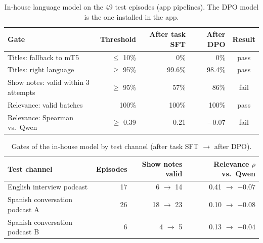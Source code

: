 \begin{table}[H]
\centering
\caption{In-house language model on the 49 test episodes (app pipelines). The DPO model is the one installed in the app.}
\label{tab:ownllm-gates}
\small
\begin{tabular}{@{}lrrrc@{}}
\toprule
\textbf{Gate} & \textbf{Threshold} & \textbf{After task SFT} & \textbf{After DPO} & \textbf{Result} \\
\midrule
Titles: fallback to mT5 & $\leq$ 10\% & 0\% & 0\% & pass \\
Titles: right language & $\geq$ 95\% & 99.6\% & 98.4\% & pass \\
Show notes: valid within 3 attempts & $\geq$ 95\% & 57\% & 86\% & fail \\
Relevance: valid batches & 100\% & 100\% & 100\% & pass \\
Relevance: Spearman vs.\ Qwen & $\geq$ 0.39 & 0.21 & $-0.07$ & fail \\
\bottomrule
\end{tabular}
\end{table}

\begin{table}[H]
\centering
\caption{Gates of the in-house model by test channel (after task SFT $\rightarrow$ after DPO).}
\label{tab:ownllm-channels}
\small
\begin{tabular}{@{}lrrr@{}}
\toprule
\textbf{Test channel} & \textbf{Episodes} & \textbf{Show notes valid} & \textbf{Relevance $\rho$ vs.\ Qwen} \\
\midrule
English interview podcast & 17 & 6 $\rightarrow$ 14 & 0.41 $\rightarrow$ $-0.07$ \\
Spanish conversation podcast A & 26 & 18 $\rightarrow$ 23 & 0.10 $\rightarrow$ $-0.08$ \\
Spanish conversation podcast B & 6 & 4 $\rightarrow$ 5 & 0.13 $\rightarrow$ $-0.04$ \\
\bottomrule
\end{tabular}
\end{table}

